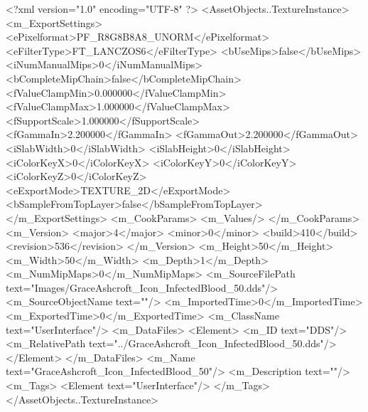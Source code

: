 <?xml version="1.0" encoding="UTF-8" ?>
<AssetObjects..TextureInstance>
	<m_ExportSettings>
		<ePixelformat>PF_R8G8B8A8_UNORM</ePixelformat>
		<eFilterType>FT_LANCZOS6</eFilterType>
		<bUseMips>false</bUseMips>
		<iNumManualMips>0</iNumManualMips>
		<bCompleteMipChain>false</bCompleteMipChain>
		<fValueClampMin>0.000000</fValueClampMin>
		<fValueClampMax>1.000000</fValueClampMax>
		<fSupportScale>1.000000</fSupportScale>
		<fGammaIn>2.200000</fGammaIn>
		<fGammaOut>2.200000</fGammaOut>
		<iSlabWidth>0</iSlabWidth>
		<iSlabHeight>0</iSlabHeight>
		<iColorKeyX>0</iColorKeyX>
		<iColorKeyY>0</iColorKeyY>
		<iColorKeyZ>0</iColorKeyZ>
		<eExportMode>TEXTURE_2D</eExportMode>
		<bSampleFromTopLayer>false</bSampleFromTopLayer>
	</m_ExportSettings>
	<m_CookParams>
		<m_Values/>
	</m_CookParams>
	<m_Version>
		<major>4</major>
		<minor>0</minor>
		<build>410</build>
		<revision>536</revision>
	</m_Version>
	<m_Height>50</m_Height>
	<m_Width>50</m_Width>
	<m_Depth>1</m_Depth>
	<m_NumMipMaps>0</m_NumMipMaps>
	<m_SourceFilePath text="Images/GraceAshcroft_Icon_InfectedBlood_50.dds"/>
	<m_SourceObjectName text=""/>
	<m_ImportedTime>0</m_ImportedTime>
	<m_ExportedTime>0</m_ExportedTime>
	<m_ClassName text="UserInterface"/>
	<m_DataFiles>
		<Element>
			<m_ID text="DDS"/>
			<m_RelativePath text="../GraceAshcroft_Icon_InfectedBlood_50.dds"/>
		</Element>
	</m_DataFiles>
	<m_Name text="GraceAshcroft_Icon_InfectedBlood_50"/>
	<m_Description text=""/>
	<m_Tags>
		<Element text="UserInterface"/>
	</m_Tags>
</AssetObjects..TextureInstance>
